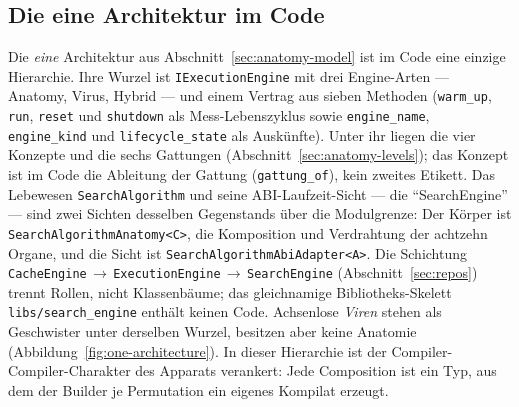 \begin{nurkurz}
\subsection{Die eine Architektur im Code}\label{sec:impl-architecture}
Die \emph{eine} Architektur aus Abschnitt~\ref{sec:anatomy-model} ist im Code eine einzige Hierarchie. Ihre
Wurzel ist \texttt{IExecutionEngine} mit drei Engine-Arten --- Anatomy, Virus, Hybrid --- und einem Vertrag
aus sieben Methoden (\texttt{warm\_up}, \texttt{run}, \texttt{reset} und \texttt{shutdown} als
Mess-Lebenszyklus sowie \texttt{engine\_name}, \texttt{engine\_kind} und \texttt{lifecycle\_state} als
Auskünfte). Unter ihr liegen die vier Konzepte und die sechs Gattungen (Abschnitt~\ref{sec:anatomy-levels});
das Konzept ist im Code die Ableitung der Gattung (\texttt{gattung\_of}), kein zweites Etikett. Das Lebewesen
\texttt{SearchAlgorithm} und seine ABI-Laufzeit-Sicht --- die \enquote{SearchEngine} --- sind zwei Sichten
desselben Gegenstands über die Modulgrenze: Der Körper ist \texttt{SearchAlgorithmAnatomy<C>}, die
Komposition und Verdrahtung der achtzehn Organe, und die Sicht ist \texttt{SearchAlgorithmAbiAdapter<A>}.
Die Schichtung \texttt{CacheEngine}\,$\to$\,\texttt{ExecutionEngine}\,$\to$\,\texttt{SearchEngine}
(Abschnitt~\ref{sec:repos}) trennt Rollen, nicht Klassenbäume; das gleichnamige Bibliotheks-Skelett
\texttt{libs/search\_engine} enthält keinen Code. Achsenlose \emph{Viren} stehen als Geschwister unter
derselben Wurzel, besitzen aber keine Anatomie (Abbildung~\ref{fig:one-architecture}). In dieser Hierarchie
ist der Compiler-Compiler-Charakter des Apparats verankert: Jede Composition ist ein Typ, aus dem der
Builder je Permutation ein eigenes Kompilat erzeugt.
\end{nurkurz}

